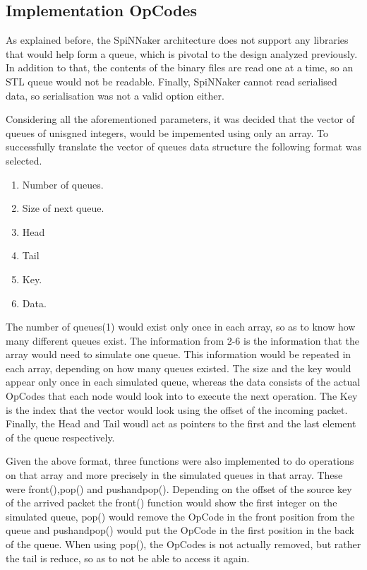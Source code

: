 \documentclass[12pt,a4paper]{article}
\begin{document}
\subsection{Implementation OpCodes}
As explained before, the SpiNNaker architecture does not support any libraries that would help form a queue, which is pivotal to the design analyzed previously. In addition to that, the contents of the binary files are read one at a time, so an STL queue would not be readable. Finally, SpiNNaker cannot read serialised data, so serialisation was not a valid option either.

Considering all the aforementioned parameters, it was decided that the vector of queues of unisgned integers, would be impemented using only an array. To successfully translate the vector of queues data structure the following format was selected.

\begin{enumerate}
\item Number of queues.
\item Size of next queue.
\item Head
\item Tail
\item Key.
\item Data.
\end{enumerate}
The number of queues(1) would exist only once in each array, so as to know how many different queues exist. The information from 2-6 is the information that the array would need to simulate one queue. This information would be repeated in each array, depending on how many queues existed. The size and the key would appear only once in each simulated queue, whereas the data consists of the actual OpCodes that each node would look into to execute the next operation. The Key is the index that the vector would look using the offset of the incoming packet. Finally, the Head and Tail woudl act as pointers to the first and the last element of the queue respectively.

Given the above format, three functions were also implemented to do operations on that array and more precisely in the simulated queues in that array. These were front(),pop() and pushandpop(). Depending on the offset of the source key of the arrived packet the front() function would show the first integer on the simulated queue, pop() would remove the OpCode in the front position from the queue and pushandpop() would put the OpCode in the first position in the back of the queue. When using pop(), the OpCodes is not actually removed, but rather the tail is reduce, so as to not be able to access it again.
\end{document}
